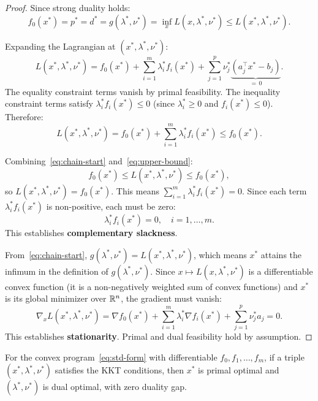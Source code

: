 \documentclass[11pt,a4paper]{article}
\begin{document}
\begin{proof}
Since strong duality holds:
\begin{equation}\label{eq:chain-start}
  f_0(x^*) = p^* = d^* = g(\lambda^*, \nu^*)
  = \inf_{x} L(x, \lambda^*, \nu^*) \le L(x^*, \lambda^*, \nu^*).
\end{equation}

Expanding the Lagrangian at $(x^*, \lambda^*, \nu^*)$:
\begin{equation}\label{eq:expand-L}
  L(x^*, \lambda^*, \nu^*) = f_0(x^*)
    + \sum_{i=1}^m \lambda^*_i f_i(x^*)
    + \sum_{j=1}^p \nu^*_j \underbrace{(a_j^\top x^* - b_j)}_{=\,0}.
\end{equation}
The equality constraint terms vanish by primal feasibility. The inequality
constraint terms satisfy $\lambda^*_i f_i(x^*) \le 0$ (since
$\lambda^*_i \ge 0$ and $f_i(x^*) \le 0$). Therefore:
\begin{equation}\label{eq:upper-bound}
  L(x^*, \lambda^*, \nu^*) = f_0(x^*) + \sum_{i=1}^m \lambda^*_i f_i(x^*)
  \le f_0(x^*).
\end{equation}

Combining~\eqref{eq:chain-start} and~\eqref{eq:upper-bound}:
\[
  f_0(x^*) \le L(x^*, \lambda^*, \nu^*) \le f_0(x^*),
\]
so $L(x^*, \lambda^*, \nu^*) = f_0(x^*)$. This means
$\sum_{i=1}^m \lambda^*_i f_i(x^*) = 0$. Since each term
$\lambda^*_i f_i(x^*)$ is non-positive, each must be zero:
\begin{equation}\label{eq:cs-derived}
  \lambda^*_i f_i(x^*) = 0, \quad i = 1, \dots, m.
\end{equation}
This establishes \textbf{complementary slackness}.

From~\eqref{eq:chain-start}, $g(\lambda^*, \nu^*) = L(x^*, \lambda^*, \nu^*)$,
which means $x^*$ attains the infimum in the definition of
$g(\lambda^*, \nu^*)$. Since $x \mapsto L(x, \lambda^*, \nu^*)$ is a
differentiable convex function (it is a non-negatively weighted sum of convex
functions) and $x^*$ is its global minimizer over $\mathbb{R}^n$, the gradient must
vanish:
\begin{equation}\label{eq:stat-derived}
  \nabla_x L(x^*, \lambda^*, \nu^*)
  = \nabla f_0(x^*) + \sum_{i=1}^m \lambda^*_i \nabla f_i(x^*)
    + \sum_{j=1}^p \nu^*_j a_j = 0.
\end{equation}
This establishes \textbf{stationarity}. Primal and dual feasibility hold by
assumption.
\end{proof}

\begin{theorem}\label{thm:kkt-sufficient}
For the convex program~\eqref{eq:std-form} with differentiable
$f_0, f_1, \dots, f_m$, if a triple $(x^*, \lambda^*, \nu^*)$ satisfies
the KKT conditions, then $x^*$ is primal optimal and $(\lambda^*, \nu^*)$
is dual optimal, with zero duality gap.
\end{theorem}
\end{document}
